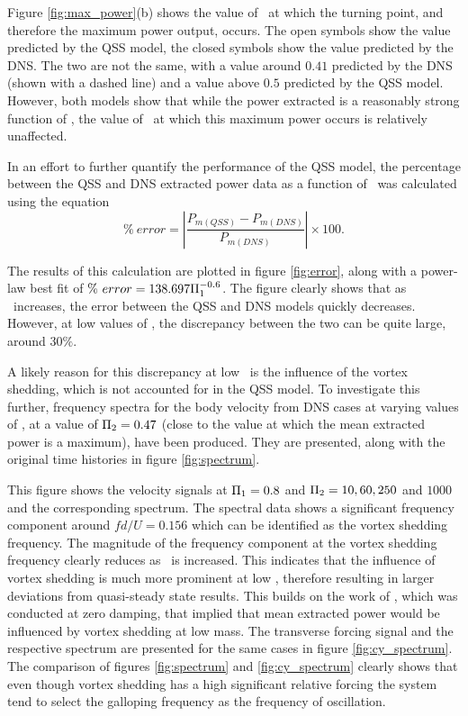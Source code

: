 Figure \ref{fig:max_power}(b) shows the value of \massdamp\ at which the turning point, and therefore the maximum power output, occurs. The open symbols show the value predicted by the QSS model, the closed symbols show the value predicted by the DNS. The two are not the same, with a value around $0.41$ predicted by the DNS (shown with a dashed line) and a value above $0.5$ predicted by the QSS model. However, both models show that while the power extracted is a reasonably strong function of \massstiff, the value of \massdamp\ at which this maximum power occurs is relatively unaffected.

In an effort to further quantify the performance of the QSS model, the percentage between the QSS and DNS extracted power data as a function of \massstiff\ was calculated using the equation
\begin{equation}   \label{eqn:error_calculation} 
\% \ error=\left|{\frac{P_{m(QSS)} - P_{m(DNS)}}{P_{m(DNS)}}}\right| \times 100.
\end{equation}

The results of this calculation are plotted in figure \ref{fig:error}, along with a power-law best fit of $\% \ error = 138.697\Pi_1^{-0.6}$. The figure clearly shows that as \massstiff \ increases, the error between the QSS and DNS models quickly decreases. However, at low values of \massstiff, the discrepancy between the two can be quite large, around $30\%$.



A likely reason for this discrepancy at low \massstiff\ is the influence of the vortex shedding, which is not accounted for in the QSS model. To investigate this further, frequency spectra for the body velocity from DNS cases at varying values of \massstiff, at a value of $\Pi_2=0.47$ (close to the value at which the mean extracted power is a maximum), have been produced. They are presented, along with the original time histories in figure \ref{fig:spectrum}.





This figure shows the  velocity signals at $\Pi_1=0.8$ and $\Pi_2= 10, 60, 250$ and $1000$ and the corresponding spectrum. The spectral data shows a significant frequency component around $fd/U=0.156$ which can be identified as the vortex shedding frequency. The magnitude of the frequency component at the vortex shedding frequency clearly reduces as \massstiff\ is increased. This indicates that the influence of vortex shedding is much more prominent at low \massstiff,  therefore resulting in larger deviations from quasi-steady state results. This builds on the work of \cite{Joly2012}, which was conducted at zero damping, that implied that mean extracted power would be influenced by vortex shedding at low mass. The transverse forcing signal and the respective spectrum are presented for the same cases in figure \ref{fig:cy_spectrum}. The comparison of figures \ref{fig:spectrum} and \ref{fig:cy_spectrum} clearly shows that even though vortex shedding has a high significant relative forcing the system tend to select the galloping frequency as the frequency of oscillation.

